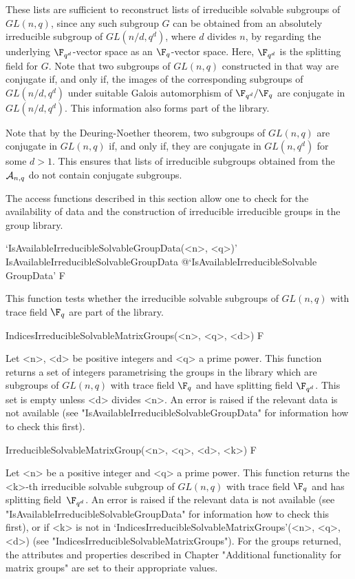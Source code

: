 These lists are sufficient to reconstruct lists of irreducible solvable
subgroups of $GL(n, q)$, since  any such subgroup $G$ can be obtained from an
absolutely irreducible subgroup of $GL(n/d, q^d)$, where $d$ divides $n$,
by regarding the underlying $\F_{q^d}$-vector space as an $\F_q$-vector
space. Here, $\F_{q^d}$ is the splitting field for $G$.
Note that two subgroups of $GL(n, q)$
constructed in that way are conjugate if, and only if, the images of the corresponding subgroups
of $GL(n/d, q^d)$ under suitable Galois automorphism of $\F_{q^d}/\F_q$ are conjugate in $GL(n/d,
q^d)$. This information also forms part of the {\IRREDSOL} library.

Note that by the Deuring-Noether theorem, two subgroups of $GL(n, q)$ are
conjugate in $GL(n, q)$ if, and only if, they are conjugate in $GL(n, q^d)$
for some $d > 1$. This ensures that lists of irreducible subgroups obtained
from the ${\cal A}_{n,q}$ do not contain conjugate subgroups. 



The access functions described in this section allow one
to check for the availability of data and the construction of irreducible
irreducible  groups in the {\IRREDSOL} group library.

\>`IsAvailableIrreducibleSolvableGroupData(<n>, <q>)'%
{IsAvailableIrreducibleSolvableGroupData}%
@{`IsAvailableIrreducibleSolvable\\GroupData'} F

This function tests whether the irreducible solvable subgroups of $GL(n,q)$ with trace
field $\F_q$ are part of the {\IRREDSOL} library.


\>IndicesIrreducibleSolvableMatrixGroups(<n>, <q>, <d>) F

Let <n>, <d> be positive integers and <q> a prime power. This
function returns a set of integers parametrising the groups in the {\IRREDSOL} library
which are subgroups of $GL(n,q)$ with trace field $\F_q$
and have splitting field $\F_{q^d}$. This set is empty unless <d> divides <n>. An error is 
raised if the relevant data is not available (see "IsAvailableIrreducibleSolvableGroupData" 
for information how to check this first).


\>IrreducibleSolvableMatrixGroup(<n>, <q>, <d>, <k>) F

Let <n> be a  positive integer and <q> a prime power. This
function returns the <k>-th irreducible solvable subgroup of $GL(n,q)$ with trace field $\F_q$ 
and has splitting field~$\F_{q^d}$.
An error is raised if the relevant
data is not available (see "IsAvailableIrreducibleSolvableGroupData" for information 
how to check this first), or if <k> is not in  
`IndicesIrreducibleSolvableMatrixGroups'(<n>, <q>, <d>) 
(see "IndicesIrreducibleSolvableMatrixGroups").
For the groups returned, the attributes and properties described in
Chapter "Additional functionality for matrix groups" are set to their appropriate values.



